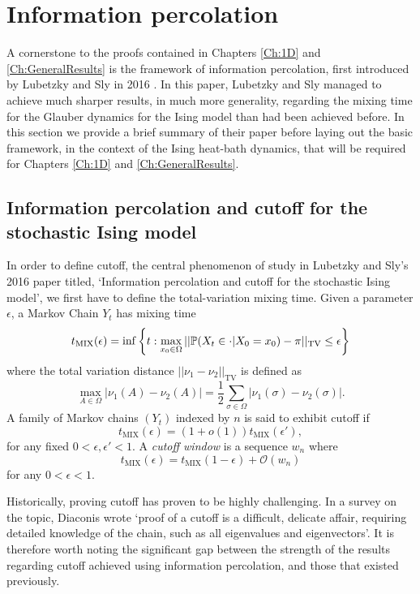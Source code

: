 	
\section{Information percolation}
	A cornerstone to the proofs contained in Chapters \ref{Ch:1D} and \ref{Ch:GeneralResults} is the framework of information percolation, first introduced by Lubetzky and Sly in 2016 \cite{Lubetzky2016-wd}. In this paper, Lubetzky and Sly managed to achieve much sharper results, in much more generality, regarding the mixing time for the Glauber dynamics for the Ising model than had been achieved before. In this section we provide a brief summary of their paper before laying out the basic framework, in the context of the Ising heat-bath dynamics, that will be required for Chapters \ref{Ch:1D} and \ref{Ch:GeneralResults}.

	\subsection{Information percolation and cutoff for the stochastic Ising model}
	In order to define cutoff, the central phenomenon of study in Lubetzky and Sly's 2016 paper titled, `Information percolation and cutoff for the stochastic Ising model', we first have to define the total-variation mixing time. Given a parameter $\epsilon$, a Markov Chain $Y_t$ has mixing time
	\begin{equation}
		t_\mathrm{MIX}(\epsilon) = \inf\left\{t: \max_{x_0 \in \Omega} ||\mathbb{P}(X_t \in \cdot | X_0 = x_0) - \pi ||_\mathrm{TV} \leq \epsilon \right\}
	\end{equation}
	where the total variation distance $||\nu_1 - \nu_2||_\mathrm{TV}$ is defined as 
	\begin{equation}
		\max_{A \in \Omega}|\nu_1(A) - \nu_2(A)| = \frac{1}{2}\sum_{\sigma \in \Omega} |\nu_1(\sigma) - \nu_2(\sigma)|.
	\end{equation}
	A family of Markov chains $(Y_t)$ indexed by $n$ is said to exhibit cutoff if
	\begin{equation}
		t_\mathrm{MIX}(\epsilon) = (1 + o(1)) t_\mathrm{MIX}(\epsilon'),
	\end{equation}
	for any fixed $0 < \epsilon, \epsilon' < 1$. A \emph{cutoff window} is a sequence $w_n$ where
	\begin{equation}
		t_\mathrm{MIX}(\epsilon) = t_\mathrm{MIX}(1 - \epsilon) + \mathcal{O}(w_n)
	\end{equation}
	for any $0 < \epsilon <1$.

	Historically, proving cutoff has proven to be highly challenging. In a survey on the topic, Diaconis \cite{Diaconis1996-sz} wrote `proof of a cutoff is a difficult, delicate affair, requiring detailed knowledge of the chain, such as all eigenvalues and eigenvectors'. It is therefore worth noting the significant gap between the strength of the results regarding cutoff achieved using information percolation, and those that existed previously.


